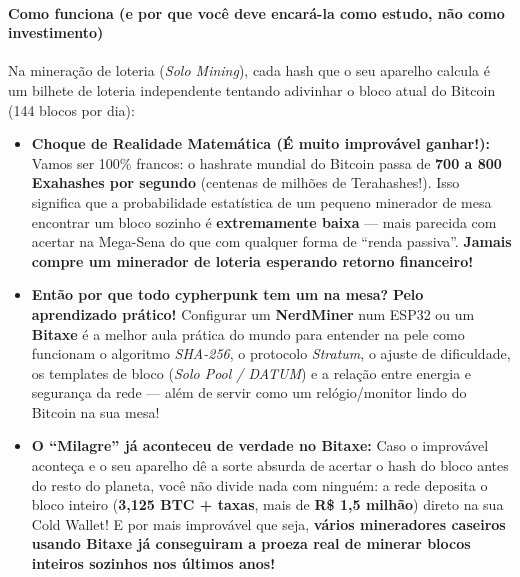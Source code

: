 \documentclass{pousadaguide}
\begin{document}
\paragraph{Como funciona (e por que você deve encará-la como estudo, não como investimento)}
Na mineração de loteria (\emph{Solo Mining}), cada hash que o seu aparelho calcula é um bilhete de loteria independente tentando adivinhar o bloco atual do Bitcoin (144 blocos por dia):
\begin{itemize}
  \item \textbf{Choque de Realidade Matemática (É muito improvável ganhar!):} Vamos ser 100\% francos: o hashrate mundial do Bitcoin passa de \textbf{700 a 800 Exahashes por segundo} (centenas de milhões de Terahashes!). Isso significa que a probabilidade estatística de um pequeno minerador de mesa encontrar um bloco sozinho é \textbf{extremamente baixa} — mais parecida com acertar na Mega-Sena do que com qualquer forma de ``renda passiva''. \textbf{Jamais compre um minerador de loteria esperando retorno financeiro!}
  \item \textbf{Então por que todo cypherpunk tem um na mesa?} \textbf{Pelo aprendizado prático!} Configurar um \textbf{NerdMiner} num ESP32 ou um \textbf{Bitaxe} é a melhor aula prática do mundo para entender na pele como funcionam o algoritmo \emph{SHA-256}, o protocolo \emph{Stratum}, o ajuste de dificuldade, os templates de bloco (\emph{Solo Pool / DATUM}) e a relação entre energia e segurança da rede — além de servir como um relógio/monitor lindo do Bitcoin na sua mesa!
  \item \textbf{O “Milagre” já aconteceu de verdade no Bitaxe:} Caso o improvável aconteça e o seu aparelho dê a sorte absurda de acertar o hash do bloco antes do resto do planeta, você não divide nada com ninguém: a rede deposita o bloco inteiro (\textbf{3,125 BTC + taxas}, mais de \textbf{R\$ 1,5 milhão}) direto na sua Cold Wallet! E por mais improvável que seja, \textbf{vários mineradores caseiros usando Bitaxe já conseguiram a proeza real de minerar blocos inteiros sozinhos nos últimos anos!}
\end{itemize}
\end{document}
